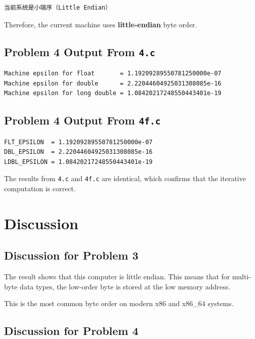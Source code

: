 \documentclass[12pt,a4paper]{article}
\begin{document}
\begin{lstlisting}
当前系统是小端序（Little Endian）
\end{lstlisting}

Therefore, the current machine uses \textbf{little-endian} byte order.

\subsection*{Problem 4 Output From \texttt{4.c}}

\begin{lstlisting}
Machine epsilon for float       = 1.19209289550781250000e-07
Machine epsilon for double      = 2.22044604925031308085e-16
Machine epsilon for long double = 1.08420217248550443401e-19
\end{lstlisting}

\subsection*{Problem 4 Output From \texttt{4f.c}}

\begin{lstlisting}
FLT_EPSILON  = 1.19209289550781250000e-07
DBL_EPSILON  = 2.22044604925031308085e-16
LDBL_EPSILON = 1.08420217248550443401e-19
\end{lstlisting}

The results from \texttt{4.c} and \texttt{4f.c} are identical, which confirms that the iterative computation is correct.

\section{Discussion}

\subsection*{Discussion for Problem 3}

The result shows that this computer is little endian. This means that for multi-byte data types, the low-order byte is stored at the low memory address.

This is the most common byte order on modern x86 and x86\_64 systems.

\subsection*{Discussion for Problem 4}
\end{document}
